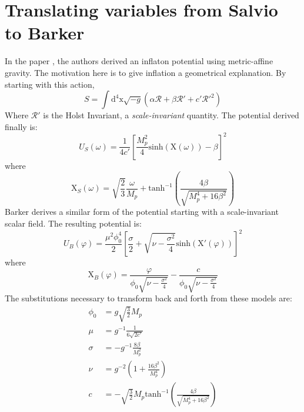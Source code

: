 \documentclass[aps,prd,reprint,preprintnumbers,showpacs,floatfix,nofootinbib,superscript address]{revtex4-2}
\begin{document}
\section{Translating variables from Salvio to Barker} \label{Appendix A}
In the paper \cite{Salvio_2022}, the authors derived an inflaton potential using metric-affine gravity. The motivation here is to give inflation a geometrical explanation. 
By starting with this action, 
\begin{equation}
    S = \int \text{d}^4\text{x} \sqrt{-g} (\alpha \mathcal{R} + \beta \mathcal{R}' + c' \mathcal{R}'^{2})
\end{equation}
Where $\mathcal{R}'$ is the Holst Invariant, a \textit{scale-invariant} quantity. The potential derived finally is: 
\begin{equation}
    U_S(\omega) = \frac{1}{4 c'} \left[ \frac{M_{p}^{2}}{4} \text{sinh}(\text{X}(\omega)) - \beta  \right]^2
\end{equation}
where
\begin{equation}
    \text{X}_S(\omega) = \sqrt{\frac{2}{3}} \frac{\omega}{M_{p}} + \text{tanh}^{-1} \left(\frac{4 \beta}{\sqrt{M_{p}^{4}+16 \beta^2}} \right)
\end{equation}
Barker \cite{barker2024poincaregaugetheoryconformal} derives a similar form of the potential starting with a scale-invariant scalar field. The resulting potential is:
\begin{equation}
    U_B(\varphi) = \frac{\mu^2 \phi_{0}^{4}}{2} \left[ \frac{\sigma}{2} + \sqrt{\nu - \frac{\sigma^2}{4}} \text{sinh}\left( \text{X}'(\varphi) \right)  \right]^2
\end{equation}
where
\begin{equation}
    \text{X}_B(\varphi) =  \frac{\varphi}{\phi_0 \sqrt{\nu - \frac{\sigma^2}{4}}} - \frac{c}{\phi_0 \sqrt{\nu - \frac{\sigma^2}{4}}}
\end{equation}
The substitutions necessary to transform back and forth from these models are: 
\begin{align}
    \phi_0 &= g \sqrt{\frac{3}{2}} M_p  \nonumber \\
    \mu &= g^{-1} \frac{1}{6 \sqrt{2 c'}}  \nonumber \\
    \sigma &= - g^{-1} \frac{8 \beta}{M_{p}^{2}}  \nonumber \\
    \nu &= g^{-2} \left( 1 + \frac{16 \beta^2}{M_{p}^{4}} \right) \nonumber \\
    c  &= -\sqrt{\frac{3}{2}} M_{p} \text{tanh}^{-1} \left(\frac{4 \beta}{\sqrt{M_{p}^{4}+16 \beta^2}} \right)
\end{align}
\end{document}

